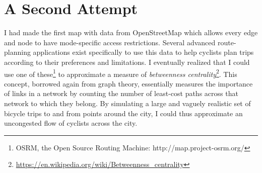 \documentclass{article}
\begin{document}
	\section*{A Second Attempt}
		I had made the first map with data from OpenStreetMap which allows every edge and node to have mode-specific access restrictions. Several advanced route-planning applications exist specifically to use this data to help cyclists plan trips according to their preferences and limitations. I eventually realized that I could use one of these\footnote{
			OSRM, the Open Source Routing Machine: http://map.project-osrm.org/
		} to approximate a measure of \textit{betweenness centrality}\footnote{
			\href{https://en.wikipedia.org/wiki/Betweenness_centrality}{https://en.wikipedia.org/wiki/Betweenness\_centrality}
		}. This concept, borrowed again from graph theory, essentially measures the importance of links in a network by counting the number of least-cost paths across that network to which they belong. By simulating a large and vaguely realistic set of bicycle trips to and from points around the city, I could thus approximate an uncongested flow of cyclists across the city. 
	
\printbibliography
	
\end{document}
